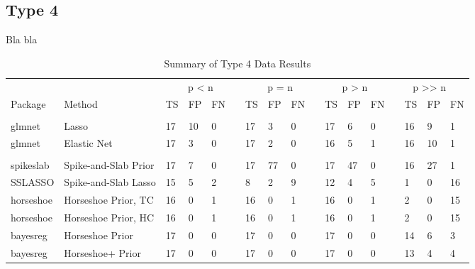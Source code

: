 \documentclass[
  11pt,
]{article}
\begin{document}
\subsection{Type 4}

Bla bla

\begin{table}[!h]

\caption{\label{tab:Results T4}Summary of Type 4 Data Results}
\centering
\fontsize{8.5}{10.5}\selectfont
\begin{tabular}[t]{>{}l|>{}l|>{}l|>{}l|>{}l|>{}l|>{}l|>{}l|>{}l|>{}l|>{}l|>{}l|>{}l|>{}l|>{}l|>{}l|>{}l|}
\toprule
\multicolumn{2}{c}{ } & \multicolumn{4}{c}{p < n} & \multicolumn{4}{c}{p = n} & \multicolumn{3}{c}{p > n} & \multicolumn{4}{c}{p >> n} \\
\cmidrule(l{3pt}r{3pt}){3-6} \cmidrule(l{3pt}r{3pt}){7-10} \cmidrule(l{3pt}r{3pt}){11-13} \cmidrule(l{3pt}r{3pt}){14-17}
Package & Method & TS & FP & FN &  & TS & FP & FN &  & TS & FP & FN &  & TS & FP & FN\\
\midrule
\addlinespace[0.3em]
\multicolumn{17}{l}{\textbf{Frequentist Methods}}\\
\hspace{1em}glmnet & Lasso & 17 & 10 & 0 &  & 17 & 3 & 0 &  & 17 & 6 & 0 &  & 16 & 9 & 1\\
\hspace{1em}glmnet & Elastic Net & 17 & 3 & 0 &  & 17 & 2 & 0 &  & 16 & 5 & 1 &  & 16 & 10 & 1\\
\addlinespace[0.3em]
\multicolumn{17}{l}{\textbf{Bayesian Methods}}\\
\hspace{1em}spikeslab & Spike-and-Slab Prior & 17 & 7 & 0 &  & 17 & 77 & 0 &  & 17 & 47 & 0 &  & 16 & 27 & 1\\
\hspace{1em}SSLASSO & Spike-and-Slab Lasso & 15 & 5 & 2 &  & 8 & 2 & 9 &  & 12 & 4 & 5 &  & 1 & 0 & 16\\
\hspace{1em}horseshoe & Horseshoe Prior, TC & 16 & 0 & 1 &  & 16 & 0 & 1 &  & 16 & 0 & 1 &  & 2 & 0 & 15\\
\hspace{1em}horseshoe & Horseshoe Prior, HC & 16 & 0 & 1 &  & 16 & 0 & 1 &  & 16 & 0 & 1 &  & 2 & 0 & 15\\
\hspace{1em}bayesreg & Horseshoe Prior & 17 & 0 & 0 &  & 17 & 0 & 0 &  & 17 & 0 & 0 &  & 14 & 6 & 3\\
\hspace{1em}bayesreg & Horseshoe+ Prior & 17 & 0 & 0 &  & 17 & 0 & 0 &  & 17 & 0 & 0 &  & 13 & 4 & 4\\

\end{tabular}
\end{table}
\end{document}
